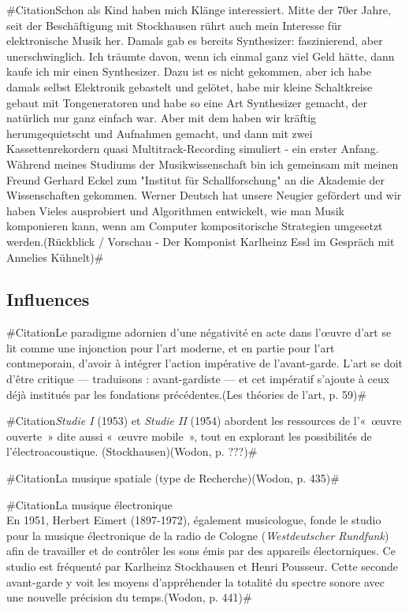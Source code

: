 \documentclass[a4paper,12pt]{article}
\newcommand{\guill}[1]{«~#1~»}
\newcommand{\zitat}[2]{\#Citation#1(#2)\#}
\begin{document}
\zitat{Schon als Kind haben mich Klänge interessiert. Mitte der 70er Jahre, seit der Beschäftigung mit Stockhausen rührt auch mein Interesse für elektronische Musik her. Damals gab es bereits Synthesizer: faszinierend, aber unerschwinglich. Ich träumte davon, wenn ich einmal ganz viel Geld hätte, dann kaufe ich mir einen Synthesizer. Dazu ist es nicht gekommen, aber ich habe damals selbst Elektronik gebastelt und gelötet, habe mir kleine Schaltkreise gebaut mit Tongeneratoren und habe so eine Art Synthesizer gemacht, der natürlich nur ganz einfach war. Aber mit dem haben wir kräftig herumgequietscht und Aufnahmen gemacht, und dann mit zwei Kassettenrekordern quasi Multitrack-Recording simuliert - ein erster Anfang. Während meines Studiums der Musikwissenschaft bin ich gemeinsam mit meinen Freund Gerhard Eckel zum "Institut für Schallforschung" an die Akademie der Wissenschaften gekommen. Werner Deutsch hat unsere Neugier gefördert und wir haben Vieles ausprobiert und Algorithmen entwickelt, wie man Musik komponieren kann, wenn am Computer kompositorische Strategien umgesetzt werden.}
{Rückblick / Vorschau - Der Komponist Karlheinz Essl im Gespräch mit Annelies Kühnelt}	

\subsection{Influences}

\zitat{Le paradigme adornien d'une négativité en acte dans l'œuvre d'art se lit comme une injonction pour l'art moderne, et en partie pour l'art contmeporain, d'avoir à intégrer l'action impérative de l'avant-garde. L'art se doit d'être critique --- traduisons : avant-gardiste --- et cet impératif s'ajoute à ceux déjà institués par les fondations précédentes.}
{Les théories de l'art, p. 59}

\zitat{\emph{Studie I} (1953) et \emph{Studie II} (1954) abordent les ressources de l'\guill{œuvre ouverte} dite aussi \guill{œuvre mobile}, tout en explorant les possibilités de l'électroacoustique. (Stockhausen)}
{Wodon, p. ???}

\zitat{La musique spatiale (type de Recherche)}
{Wodon, p. 435}

\zitat{La musique électronique \\
En 1951, Herbert Eimert (1897-1972), également musicologue, fonde le studio pour la musique électronique de la radio de Cologne (\emph{Westdeutscher Rundfunk}) afin de travailler et de contrôler les sons émis par des appareils électorniques. Ce studio est fréquenté par Karlheinz Stockhausen et Henri Pousseur. Cette seconde avant-garde y voit les moyens d'appréhender la totalité du spectre sonore avec une nouvelle précision du temps.}
{Wodon, p. 441}
\end{document}
